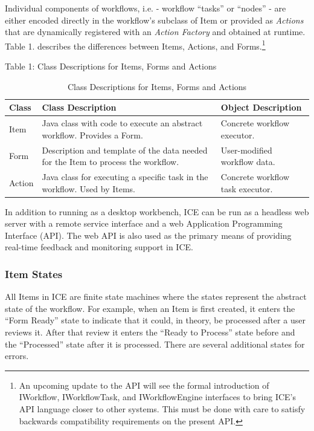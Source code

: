 Individual components of workflows, i.e. - workflow ``tasks'' or
``nodes'' - are either encoded directly in the workflow's subclass of
Item or provided as \emph{Actions} that are dynamically registered with
an \emph{Action Factory} and obtained at runtime. Table 1. describes the
differences between Items, Actions, and Forms.\footnote{An upcoming update to the API will see the formal introduction of
IWorkflow, IWorkflowTask, and IWorkflowEngine interfaces to bring ICE's
API language closer to other systems. This must be done with care to
satisfy backwards compatibility requirements on the present API.}

Table 1: Class Descriptions for Items, Forms and Actions

\begin{table}[t]
\begin{tabularx}{\textwidth}{|l|X|l|}
\hline
Class & Class Description & Object Description\tabularnewline\hline
Item & Java class with code to execute an abstract workflow. Provides a
Form. & Concrete workflow executor.\tabularnewline\hline
Form & Description and template of the data needed for the Item to
process the workflow. & User-modified workflow data.\tabularnewline\hline
Action & Java class for executing a specific task in the workflow. Used
by Items. & Concrete workflow task executor.\tabularnewline\hline
\end{tabularx}
\caption{Class Descriptions for Items, Forms and Actions}
\end{table}

In addition to running as a desktop workbench, ICE can be run as a
headless web server with a remote service interface and a web
Application Programming Interface (API). The web API is also used as the
primary means of providing real-time feedback and monitoring support in
ICE.

\subsubsection{Item States}\label{item-states}

All Items in ICE are finite state machines where the states represent
the abstract state of the workflow. For example, when an Item is first
created, it enters the ``Form Ready'' state to indicate that it could,
in theory, be processed after a user reviews it. After that review it
enters the ``Ready to Process'' state before and the ``Processed'' state
after it is processed. There are several additional states for errors.

